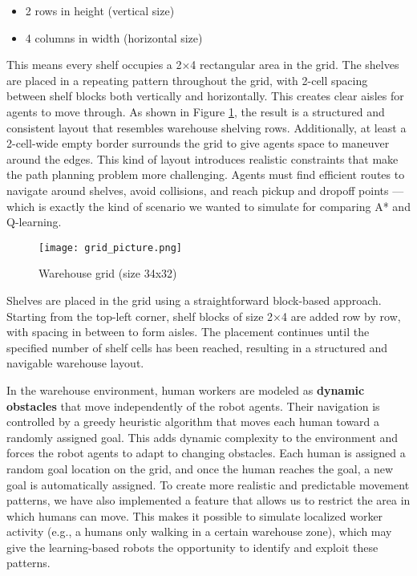 \documentclass{kththesis}
\begin{document}
\begin{itemize} 
    \item 2 rows in height (vertical size) 
    
    \item 4 columns in width (horizontal size) 
    
\end{itemize} 
This means every shelf occupies a 2×4 rectangular area in the grid.
The shelves are placed in a repeating pattern throughout the grid, with 2-cell spacing between shelf blocks both vertically and horizontally. This creates clear aisles for agents to move through. As shown in Figure \ref{Warehouse grid (size 34x32)}, the result is a structured and consistent layout that resembles warehouse shelving rows. Additionally, at least a 2-cell-wide empty border surrounds the grid to give agents space to maneuver around the edges.
This kind of layout introduces realistic constraints that make the path planning problem more challenging. Agents must find efficient routes to navigate around shelves, avoid collisions, and reach pickup and dropoff points — which is exactly the kind of scenario we wanted to simulate for comparing A* and Q-learning.

\begin{figure}
    \centering
    \texttt{[image: grid\_picture.png]}
    \caption{Warehouse grid (size 34x32)}
    \label{Warehouse grid (size 34x32)}
\end{figure}

Shelves are placed in the grid using a straightforward block-based approach. Starting from the top-left corner, shelf blocks of size 2×4 are added row by row, with spacing in between to form aisles. The placement continues until the specified number of shelf cells has been reached, resulting in a structured and navigable warehouse layout.

In the warehouse environment, human workers are modeled as \textbf{dynamic obstacles} that move independently of the robot agents. Their navigation is controlled by a greedy heuristic algorithm that moves each human toward a randomly assigned goal. This adds dynamic complexity to the environment and forces the robot agents to adapt to changing obstacles. Each human is assigned a random goal location on the grid, and once the human reaches the goal, a new goal is automatically assigned. To create more realistic and predictable movement patterns, we have also implemented a feature that allows us to restrict the area in which humans can move. This makes it possible to simulate localized worker activity (e.g., a humans only walking in a certain warehouse zone), which may give the learning-based robots the opportunity to identify and exploit these patterns. 
\end{document}
